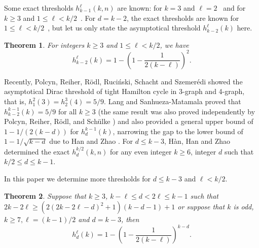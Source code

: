 \documentclass[11pt, reqno]{amsart}    	%
\newtheorem{thm}{Theorem}[section]
\theoremstyle{definition}
\numberwithin{equation}{section}
\begin{document}
	Some exact thresholds $ h_{k-1}^{\ell}(k,n) $ are known: for $ k =3$ and $\ell= 2$~\cite{2011Dirac} and for $ k \ge 3  $ and $ 1\le \ell < k/2 $~\cite{CZYGRINOW2014TIGHT,Jie2015Minimum}. 
	For $d=k-2$, the exact thresholds are known for $1\le \ell<k/2$~\cite{Bu2013Minimum, Han2015Minimum,Bastos2016Loose,J2017Loose}, but let us only state the asymptotical threshold $h_{k-2}^\ell(k)$ here. 
	
	\begin{thm} \cite{Bu2013Minimum, Bastos2016Loose}
		For integers $k\ge 3$ and $ 1\le\ell < k/2$, we have 
		\[
		h_{k-2}^\ell(k) = 1-\left(1-\frac{1}{2(k-\ell)} \right)^{2}.
		\]
	\end{thm}
	
	Recently, Polcyn, Reiher, R\"odl, Ruci\'nski, Schacht and Szemer\'edi \cite{Reiher2019Minimum,Polcyn2020Minimum}  showed the asymptotical Dirac threshold of tight Hamilton cycle in 3-graph and 4-graph, that is, $h_{1}^{2}(3)=h_{2}^{3}(4)=5/9$. Lang and Sanhueza-Matamala	 \cite{2020Minimum} proved that $ h_{k-2}^{k-1}(k)=5/9$ for all $ k \ge 3 $ (the same	result was also proved independently by Polcyn,  Reiher, R\"odl, and Sch\"ulke \cite{2020On}) and also provided a general upper bound of $ 1-1/(2(k-d)) $ for $ h_{d}^{k-1}(k)$, narrowing the gap to the lower bound of $ 1-1/\sqrt{k-d}$ due to Han and Zhao \cite{2016Forbidding}.
	For $ d\le k-3 $, H\`an, Han and Zhao \cite{han2021minimum} determined the exact $ h_{d}^{k/2}(k,n) $ for any even integer $ k \ge 6 $, integer $ d $ such that  $ k/2 \le d \le k-1 $. 
	
	In this paper we determine more thresholds for $d\le k-3$ and $\ell<k/2$. 
	\begin{thm} \label{thm1}
		Suppose that $k\ge3$, $k-\ell\le d < 2\ell \le k-1$ such that $2k-2\ell \ge (2(2k-2\ell-d)^2+1)(k-d-1)+1$ or suppose that $ k $ is odd, $ k\ge7,\ell=(k-1)/2 $  and  $d=k-3$, then 
		\[
		h_{d}^{\ell}(k) = 1-\left(1-\frac{1}{2(k-\ell)}\right)^{k-d}.
		\] 
	\end{thm}
	
\end{document}
